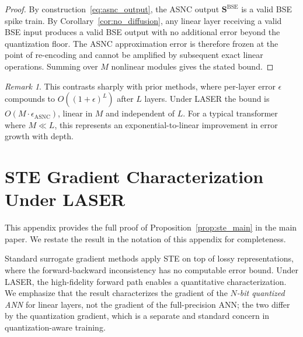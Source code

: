 \documentclass{article}
\theoremstyle{plain}
\theoremstyle{definition}
\theoremstyle{remark}
\newtheorem{remark}[theorem]{Remark}
\begin{document}
\begin{proof}
By construction~\eqref{eq:asnc_output}, the ASNC output $\mathbf{S}^{\mathrm{BSE}}$
is a valid BSE spike train. By Corollary~\ref{cor:no_diffusion}, any linear layer
receiving a valid BSE input produces a valid BSE output with no additional error
beyond the quantization floor. The ASNC approximation error is therefore frozen at
the point of re-encoding and cannot be amplified by subsequent exact linear
operations. Summing over $M$ nonlinear modules gives the stated bound.
\end{proof}

\begin{remark}
This contrasts sharply with prior methods, where per-layer error $\epsilon$ compounds
to $O((1+\epsilon)^L)$ after $L$ layers. Under LASER the bound is
$O(M \cdot \epsilon_{\mathrm{ASNC}})$, linear in $M$ and independent of $L$. For a
typical transformer where $M \ll L$, this represents an exponential-to-linear
improvement in error growth with depth.
\end{remark}


\section{STE Gradient Characterization Under LASER}
\label{app:ste_proof}

This appendix provides the full proof of Proposition~\ref{prop:ste_main} in the main
paper. We restate the result in the notation of this appendix for completeness.

Standard surrogate gradient methods apply STE on top of lossy representations, where
the forward-backward inconsistency has no computable error bound. Under LASER, the
high-fidelity forward path enables a quantitative characterization. We emphasize that
the result characterizes the gradient of the \emph{$N$-bit quantized ANN} for linear
layers, not the gradient of the full-precision ANN; the two differ by the quantization
gradient, which is a separate and standard concern in quantization-aware training.
\end{document}

